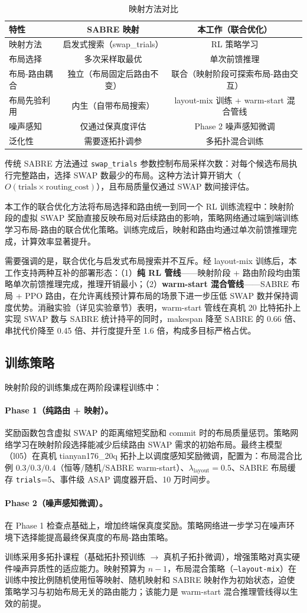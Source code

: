 \begin{table}[htbp]
\centering
\caption{映射方法对比}
\label{tab:mapping-comparison}
\small
\begin{tabular}{l|cc}
\hline
特性 & SABRE 映射 & 本工作（联合优化） \\
\hline
映射方法 & 启发式搜索（swap\_trials） & RL 策略学习 \\
布局选择 & 多次采样取最优 & 单次前馈推理 \\
布局-路由耦合 & 独立（布局固定后路由不变） & 联合（映射阶段可探索布局-路由交互） \\
布局先验利用 & 内生（自带布局搜索） & layout-mix 训练 + warm-start 混合管线 \\
噪声感知 & 仅通过保真度评估 & Phase 2 噪声感知微调 \\
泛化性 & 需要逐拓扑调参 & 多拓扑混合训练 \\
\hline
\end{tabular}
\end{table}

传统 SABRE 方法通过 \texttt{swap\_trials} 参数控制布局采样次数：对每个候选布局执行完整路由，选择 SWAP 数最少的布局。这种方法计算开销大（$O(\text{trials} \times \text{routing\_cost})$），且布局质量仅通过 SWAP 数间接评估。

本工作的联合优化方法将布局选择和路由统一到同一个 RL 训练流程中：映射阶段的虚拟 SWAP 奖励直接反映布局对后续路由的影响，策略网络通过端到端训练学习布局-路由的联合优化策略。训练完成后，映射和路由均通过单次前馈推理完成，计算效率显著提升。

需要强调的是，联合优化与启发式布局搜索并不互斥。经 layout-mix 训练后，本工作支持两种互补的部署形态：（1）\textbf{纯 RL 管线}——映射阶段 + 路由阶段均由策略单次前馈推理完成，推理开销最小；（2）\textbf{warm-start 混合管线}——SABRE 布局 + PPO 路由，在允许离线预计算布局的场景下进一步压低 SWAP 数并保持调度优势。消融实验（详见实验章节）表明，warm-start 管线在真机 20 比特拓扑上实现 SWAP 数与 SABRE 统计持平的同时，makespan 降至 SABRE 的 0.66 倍、串扰代价降至 0.45 倍、并行度提升至 1.6 倍，构成多目标严格占优。

\subsection{训练策略}

映射阶段的训练集成在两阶段课程训练中：

\paragraph{Phase 1（纯路由 + 映射）。} 奖励函数包含虚拟 SWAP 的距离缩短奖励和 commit 时的布局质量惩罚。策略网络学习在映射阶段选择能减少后续路由 SWAP 需求的初始布局。最终主模型（l05）在真机 tianyan176\_20q 拓扑上以调度感知奖励微调，配置为：布局混合比例 $0.3/0.3/0.4$（恒等/随机/SABRE warm-start）、$\lambda_{\text{layout}} = 0.5$、SABRE 布局缓存 \texttt{trials}=5、事件级 ASAP 调度器开启、10 万时间步。

\paragraph{Phase 2（噪声感知微调）。} 在 Phase 1 检查点基础上，增加终端保真度奖励。策略网络进一步学习在噪声环境下选择能提高最终保真度的布局-路由策略。

训练采用多拓扑课程（基础拓扑预训练 $\to$ 真机子拓扑微调），增强策略对真实硬件噪声异质性的适应能力。映射预算为 $n - 1$，布局混合策略（\texttt{--layout-mix}）在训练中按比例随机使用恒等映射、随机映射和 SABRE 映射作为初始状态，迫使策略学习与初始布局无关的路由能力；该能力是 warm-start 混合推理管线得以生效的前提。
